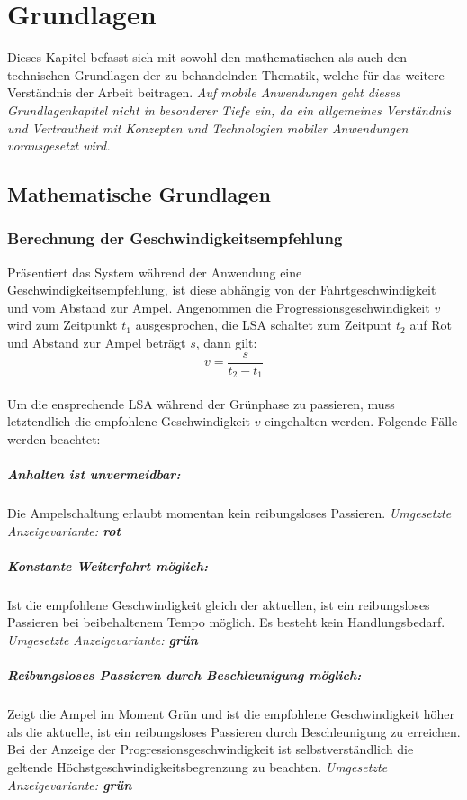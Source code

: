 \chapter{Grundlagen}
Dieses Kapitel befasst sich mit sowohl den mathematischen als auch den technischen Grundlagen der zu behandelnden Thematik, welche für das weitere Verständnis der Arbeit beitragen. \textit{Auf mobile Anwendungen geht dieses Grundlagenkapitel nicht in besonderer Tiefe ein, da ein allgemeines Verständnis und Vertrautheit mit Konzepten und Technologien mobiler Anwendungen vorausgesetzt wird.}
\section{Mathematische Grundlagen}
\subsection*{Berechnung der Geschwindigkeitsempfehlung}
Präsentiert das System während der Anwendung eine Geschwindigkeitsempfehlung, ist diese abhängig von der Fahrtgeschwindigkeit und vom Abstand zur Ampel. Angenommen die Progressionsgeschwindigkeit $v$ wird zum Zeitpunkt $t_{1}$ ausgesprochen, die \gls {LSA} schaltet zum Zeitpunt $t_{2}$ auf Rot und Abstand zur Ampel beträgt $s$, dann gilt: \\
\[ v = \frac{s}{t_{2} - t_{1}} \] \\
Um die ensprechende \gls{LSA} während der Grünphase zu passieren, muss letztendlich die empfohlene Geschwindigkeit $v$ eingehalten werden. Folgende Fälle werden beachtet:
\paragraph{Anhalten ist unvermeidbar:} Die Ampelschaltung erlaubt momentan kein reibungsloses Passieren. 
\textit{Umgesetzte Anzeigevariante: \textbf{rot}}
\paragraph{Konstante Weiterfahrt möglich:} Ist die empfohlene Geschwindigkeit gleich der aktuellen, ist ein reibungsloses Passieren bei beibehaltenem Tempo möglich. Es besteht kein Handlungsbedarf. 
\textit{Umgesetzte Anzeigevariante: \textbf{grün}}
\paragraph{Reibungsloses Passieren durch Beschleunigung möglich:} Zeigt die Ampel im Moment Grün und ist die empfohlene Geschwindigkeit höher als die aktuelle, ist ein reibungsloses Passieren durch Beschleunigung zu erreichen. Bei der Anzeige der Progressionsgeschwindigkeit ist selbstverständlich die geltende Höchstgeschwindigkeitsbegrenzung zu beachten. 
\textit{Umgesetzte Anzeigevariante: \textbf{grün}}
